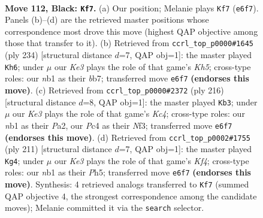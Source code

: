 \documentclass[11pt]{article}
\begin{document}
\clearpage

\begin{figure}[p]\centering
\begin{subfigure}{0.46\textwidth}\centering
\resizebox{\linewidth}{!}{%
\newchessgame
\chessboard[
  setfen={8/6B1/4k3/7b/p1p5/8/5K2/1N6 b - - 79 112},
  showmover=false,
  pgfstyle=straightmove, color=movearrow, markmove={e6-f7}
]}
\caption{}
\end{subfigure}\hfill
\begin{subfigure}{0.46\textwidth}\centering
\resizebox{\linewidth}{!}{%
\newchessgame
\chessboard[
  setfen={5B2/Pb6/4k3/2P4K/8/8/8/8 w - - 5 118},
  showmover=false,
  pgfstyle=straightmove, color=movearrow, markmove={h5-h6}
]}
\caption{}
\end{subfigure}
\\[4pt]
\begin{subfigure}{0.46\textwidth}\centering
\resizebox{\linewidth}{!}{%
\newchessgame
\chessboard[
  setfen={8/k5b1/8/8/2K5/p4N2/P7/8 w - - 74 109},
  showmover=false,
  pgfstyle=straightmove, color=movearrow, markmove={c4-b3}
]}
\caption{}
\end{subfigure}\hfill
\begin{subfigure}{0.46\textwidth}\centering
\resizebox{\linewidth}{!}{%
\newchessgame
\chessboard[
  setfen={b7/8/8/5k1p/7P/2B5/4K3/8 b - - 14 106},
  showmover=false,
  pgfstyle=straightmove, color=movearrow, markmove={f5-g4}
]}
\caption{}
\end{subfigure}
\caption{\textbf{Move 112, Black: \texttt{Kf7}.} (a) Our position; Melanie plays \texttt{Kf7} (\texttt{e6f7}). Panels (b)--(d) are the retrieved master positions whose correspondence most drove this move (highest QAP objective among those that transfer to it). (b) Retrieved from \texttt{ccrl\_top\_p0000\#1645} (ply 234) [structural distance $d$=7, QAP obj=1]: the master played \texttt{Kh6}; under $\mu$ our \emph{Ke3} plays the role of that game's \emph{Kh5}; cross-type roles: our \emph{n}b1 as their \emph{b}b7; transferred move \texttt{e6f7} \textbf{(endorses this move)}. (c) Retrieved from \texttt{ccrl\_top\_p0000\#2372} (ply 216) [structural distance $d$=8, QAP obj=1]: the master played \texttt{Kb3}; under $\mu$ our \emph{Ke3} plays the role of that game's \emph{Kc4}; cross-type roles: our \emph{n}b1 as their \emph{P}a2, our \emph{P}c4 as their \emph{N}f3; transferred move \texttt{e6f7} \textbf{(endorses this move)}. (d) Retrieved from \texttt{ccrl\_top\_p0002\#1755} (ply 211) [structural distance $d$=7, QAP obj=1]: the master played \texttt{Kg4}; under $\mu$ our \emph{Ke3} plays the role of that game's \emph{Kf4}; cross-type roles: our \emph{n}b1 as their \emph{P}h5; transferred move \texttt{e6f7} \textbf{(endorses this move)}. Synthesis: 4 retrieved analogs transferred to \texttt{Kf7} (summed QAP objective 4, the strongest correspondence among the candidate moves); Melanie committed it via the \texttt{search} selector.}
\label{fig:thought-m223}
\end{figure}
\end{document}
